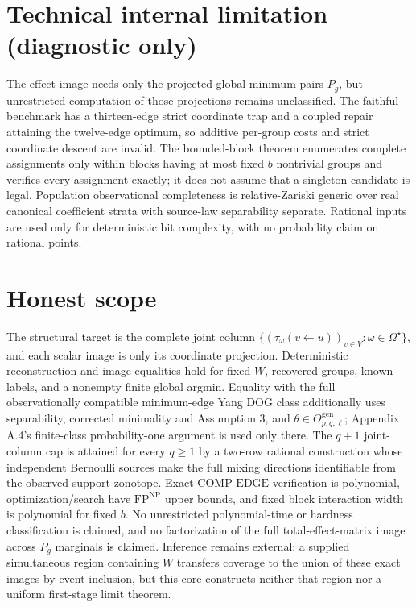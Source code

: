 \documentclass{article}
\begin{document}
\section*{Technical internal limitation (diagnostic only)}

The effect image needs only the projected global-minimum pairs \(P_g\), but unrestricted computation of those projections remains unclassified. The faithful benchmark has a thirteen-edge strict coordinate trap and a coupled repair attaining the twelve-edge optimum, so additive per-group costs and strict coordinate descent are invalid. The bounded-block theorem enumerates complete assignments only within blocks having at most fixed \(b\) nontrivial groups and verifies every assignment exactly; it does not assume that a singleton candidate is legal. Population observational completeness is relative-Zariski generic over real canonical coefficient strata with source-law separability separate. Rational inputs are used only for deterministic bit complexity, with no probability claim on rational points.

\section{Honest scope}

The structural target is the complete joint column \(\{(\tau_\omega(v\leftarrow u))_{v\in V}:\omega\in\Omega^\star\}\), and each scalar image is only its coordinate projection. Deterministic reconstruction and image equalities hold for fixed \(W\), recovered groups, known labels, and a nonempty finite global argmin. Equality with the full observationally compatible minimum-edge Yang DOG class additionally uses separability, corrected minimality and Assumption 3, and \(\theta\in\Theta_{p,q,\ell}^{\mathrm{gen}}\); Appendix A.4's finite-class probability-one argument is used only there. The \(q+1\) joint-column cap is attained for every \(q\ge1\) by a two-row rational construction whose independent Bernoulli sources make the full mixing directions identifiable from the observed support zonotope. Exact \(\mathrm{COMP\text{-}EDGE}\) verification is polynomial, optimization/search have \(\mathrm{FP}^{\mathrm{NP}}\) upper bounds, and fixed block interaction width is polynomial for fixed \(b\). No unrestricted polynomial-time or hardness classification is claimed, and no factorization of the full total-effect-matrix image across \(P_g\) marginals is claimed. Inference remains external: a supplied simultaneous region containing \(W\) transfers coverage to the union of these exact images by event inclusion, but this core constructs neither that region nor a uniform first-stage limit theorem.
\end{document}
